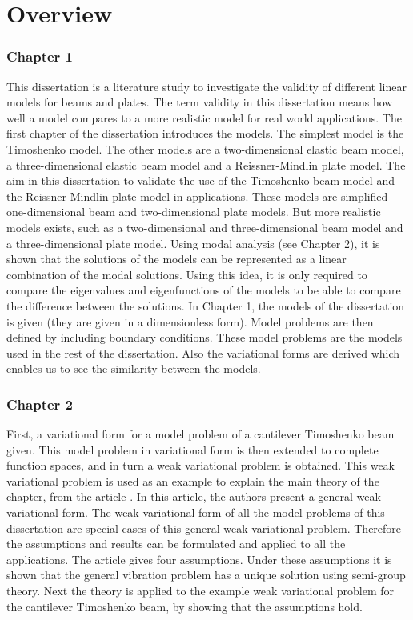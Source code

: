 \documentclass[../main.tex]{subfiles}
\begin{document}
\section{Overview}

\subsubsection{Chapter 1}
This dissertation is a literature study to investigate the validity of different linear models for beams and plates. The term validity in this dissertation means how well a model compares to a more realistic model for real world applications. The first chapter of the dissertation introduces the models. The simplest model is the Timoshenko model. The other models are a two-dimensional elastic beam model, a three-dimensional elastic beam model and a Reissner-Mindlin plate model. The aim in this dissertation to validate the use of the Timoshenko beam model and the Reissner-Mindlin plate model in applications. These models are simplified one-dimensional beam and two-dimensional plate models. But more realistic models exists, such as a two-dimensional and three-dimensional beam model and a three-dimensional plate model. Using modal analysis (see Chapter 2), it is shown that the solutions of the models can be represented as a linear combination of the modal solutions. Using this idea, it is only required to compare the eigenvalues and eigenfunctions of the models to be able to compare the difference between the solutions. In Chapter 1, the models of the dissertation is given (they are given in a dimensionless form).  Model problems are then defined by including boundary conditions. These model problems are the models used in the rest of the dissertation. Also the variational forms are derived which enables us to see the similarity between the models.

\subsubsection{Chapter 2}
First, a variational form for a model problem of a cantilever Timoshenko beam given. This model problem in variational form is then extended to complete function spaces, and in turn a weak variational problem is obtained. This weak variational problem is used as an example to explain the main theory of the chapter, from the article \cite{VV02}. In this article, the authors present a general weak variational form. The weak variational form of all the model problems of this dissertation are special cases of this general weak variational problem. Therefore the assumptions and results can be formulated and applied to all the applications. The article gives four assumptions. Under these assumptions it is shown that the general vibration problem has a unique solution using semi-group theory. Next the theory is applied to the example weak variational problem for the cantilever Timoshenko beam, by showing that the assumptions hold. 
\end{document}
